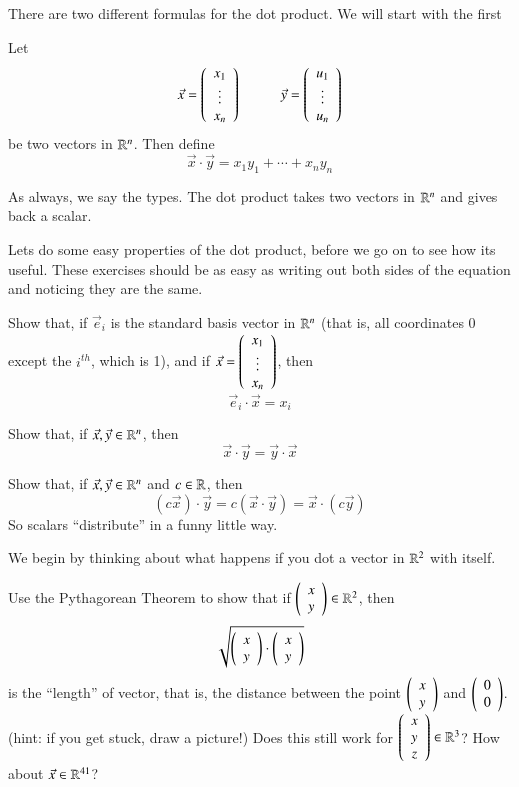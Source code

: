 \documentclass[Main.tex]{subfiles}
\begin{document}
There are two different formulas for the dot product.
We will start with the first
\begin{Def}
  Let
  \[\vec{x}=\vect{x_1\\\vdots\\x_n} \hspace{10mm}\vec{y}=\vect{u_1\\\vdots\\u_n}\]
  be two vectors in $\mathbb{R}^n$.
  Then define
  \[\vec{x}\cdot \vec{y} = x_1y_1 + \cdots + x_ny_n\]
\end{Def}
\begin{Remark}
  As always, we say the types.
  The dot product takes two vectors in $\mathbb{R}^n$ and gives back a scalar.
\end{Remark}
Lets do some easy properties of the dot product, before we go on to see how its useful.
These exercises should be as easy as writing out both sides of the equation and noticing they are the same.  
\begin{EasyEx}
  Show that, if $\vec{e}_i$ is the standard basis vector in $\mathbb{R}^n$ (that is, all coordinates 0 except the $i^{th}$, which is 1), and if $\vec{x}=\left(\begin{array}{c}x_1\\\vdots\\x_n\end{array}\right)$, then
  \[\vec{e}_i\cdot \vec{x} = x_i\]
\end{EasyEx}
\begin{EasyEx}
  Show that, if $\vec{x},\vec{y}\in\mathbb{R}^n$, then
  \[\vec{x}\cdot\vec{y}=\vec{y}\cdot\vec{x}\]
\end{EasyEx}
\begin{EasyEx}
  \label{sec:bilinear}
  Show that, if $\vec{x},\vec{y}\in\mathbb{R}^n$ and $c\in \mathbb{R}$, then
  \[(c\vec{x})\cdot\vec{y}=c(\vec{x}\cdot\vec{y})=\vec{x}\cdot(c\vec{y})\]
  So scalars ``distribute'' in a funny little way.
\end{EasyEx}
We begin by thinking about what happens if you dot a vector in $\mathbb{R}^2$ with itself.
\begin{ImpEx}
  \label{sec:selfdotlen}
  Use the Pythagorean Theorem to show that if $\left(\begin{array}{c}x\\y\end{array}\right)\in \mathbb{R}^2$, then 
  \[\sqrt{\left(\begin{array}{c}x\\y\end{array}\right)\cdot\left(\begin{array}{c}x\\y\end{array}\right)}\]
  is the ``length'' of vector, that is, the distance between the point $\left(\begin{array}{c}x\\y\end{array}\right)$ and $\left(\begin{array}{c}0\\0\end{array}\right)$.
  (hint: if you get stuck, draw a picture!)
  Does this still work for $\left(\begin{array}{c}x\\y\\z\end{array}\right)\in\mathbb{R}^3$?
  How about $\vec{x}\in \mathbb{R}^{41}$?
\end{ImpEx}
\end{document}
